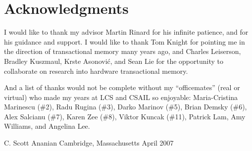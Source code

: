 \clearpage
\section*{Acknowledgments}

I would like to thank my advisor Martin Rinard for his infinite
patience, and for his guidance and support.  I would like to thank Tom
Knight for pointing me in the direction of transactional memory many
years ago, and Charles Leiserson, Bradley Kuszmaul, Krste Asonovi\'c,
and Sean Lie for the opportunity to collaborate on research into
hardware transactional memory.

And a list of thanks would not be complete without
my ``officemates'' (real or virtual) who made my
years at LCS and CSAIL so enjoyable: Maria-Cristina Marinescu (\#2),
Radu Rugina (\#3), Darko Marinov (\#5), Brian Demsky (\#6), Alex
Salcianu (\#7), Karen Zee (\#8), Viktor Kuncak (\#11), Patrick Lam,
Amy Williams, and Angelina Lee.

\begin{flushright}
C. Scott Ananian\tight
Cambridge, Massachusetts\tight
April 2007
\end{flushright}
